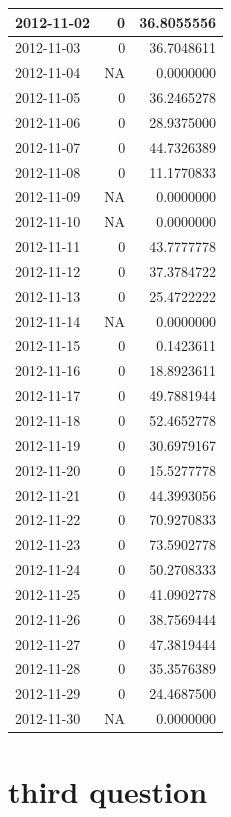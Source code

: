 \documentclass[
]{article}
\begin{document}
\begin{table}
\begin{tabular}[t]{l|r|r}
\hline
2012-11-02 & 0 & 36.8055556\\
\hline
2012-11-03 & 0 & 36.7048611\\
\hline
2012-11-04 & NA & 0.0000000\\
\hline
2012-11-05 & 0 & 36.2465278\\
\hline
2012-11-06 & 0 & 28.9375000\\
\hline
2012-11-07 & 0 & 44.7326389\\
\hline
2012-11-08 & 0 & 11.1770833\\
\hline
2012-11-09 & NA & 0.0000000\\
\hline
2012-11-10 & NA & 0.0000000\\
\hline
2012-11-11 & 0 & 43.7777778\\
\hline
2012-11-12 & 0 & 37.3784722\\
\hline
2012-11-13 & 0 & 25.4722222\\
\hline
2012-11-14 & NA & 0.0000000\\
\hline
2012-11-15 & 0 & 0.1423611\\
\hline
2012-11-16 & 0 & 18.8923611\\
\hline
2012-11-17 & 0 & 49.7881944\\
\hline
2012-11-18 & 0 & 52.4652778\\
\hline
2012-11-19 & 0 & 30.6979167\\
\hline
2012-11-20 & 0 & 15.5277778\\
\hline
2012-11-21 & 0 & 44.3993056\\
\hline
2012-11-22 & 0 & 70.9270833\\
\hline
2012-11-23 & 0 & 73.5902778\\
\hline
2012-11-24 & 0 & 50.2708333\\
\hline
2012-11-25 & 0 & 41.0902778\\
\hline
2012-11-26 & 0 & 38.7569444\\
\hline
2012-11-27 & 0 & 47.3819444\\
\hline
2012-11-28 & 0 & 35.3576389\\
\hline
2012-11-29 & 0 & 24.4687500\\
\hline
2012-11-30 & NA & 0.0000000\\
\hline
\end{tabular}
\end{table}

\hypertarget{third-question}{%
\section{third question}\label{third-question}}
\end{document}
